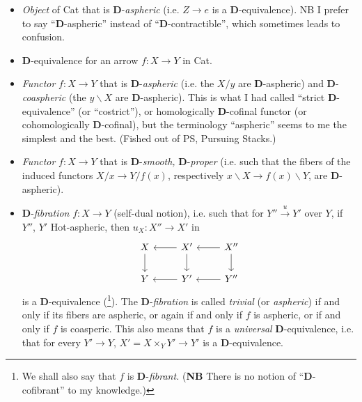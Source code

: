 \documentclass[11pt]{article}
\newcommand{\msp}[1]{\marginpar{\footnotesize [#1]}}
\newcommand{\D}{\mathbf{D}}
\begin{document}
\begin{itemize}
\item[(i)] \textit{Object} of Cat that is $\D$-\textit{aspheric} (i.e. $Z \longrightarrow e$ is a $\D$-equivalence). NB I prefer to say ``$\D$-aspheric'' instead of ``$\D$-contractible'', which sometimes leads to confusion.

\item[\textcircled{ii}] $\D$-equivalence for an arrow $f : X \longrightarrow Y$ in Cat.

\item[(iii)] \textit{Functor} $f : X \longrightarrow Y$ that is $\D$-\textit{aspheric} (i.e. the $X/y$ are $\D$-aspheric) and $\D$-\textit{coaspheric} (the $y\backslash X$ are $\D$-aspheric). This is what I had called ``strict $\D$-equivalence'' (or ``costrict''), or homologically $\D$-cofinal functor (or cohomologically $\D$-cofinal), but the terminology ``aspheric'' seems to me the simplest and the best. (Fished out of PS, Pursuing Stacks.)

\item[(iv)] \textit{Functor} $f : X \longrightarrow Y$ that is $\D$-\textit{smooth,} $\D$-\textit{proper} (i.e. such that the fibers of the induced functors $X/x \longrightarrow Y/f(x)$, respectively $x\backslash X \longrightarrow f(x)\backslash Y$, are $\D$-aspheric).

\item[(v)] $\D$-\textit{fibration} $f : X \longrightarrow Y$ (self-dual notion), i.e. such that for $Y'' \xrightarrow{u} Y'$ over $Y$, if $Y''$, $Y'$ Hot-aspheric, then $u_X : X'' \longrightarrow X'$ in
\[
\begin{tikzcd}
X \arrow[d] & X' \arrow[l] \arrow[d] & X'' \arrow[l] \arrow[d] \\
Y & Y' \arrow[l] & Y'' \arrow[l]
\end{tikzcd}
\]
is a $\D$-equivalence (\footnote{We shall also say that $f$ is $\D$-\textit{fibrant.} (\textbf{NB} There is no notion of ``$\D$-cofibrant'' to my knowledge.)}). The $\D$-\textit{fibration} is called \textit{trivial} (or \textit{aspheric}) if and only if its fibers are aspheric, or again if and only if $f$ is aspheric, or if and only if $f$ is coasperic. This also means that $f$ is a \textit{universal} $\D$-equivalence, %
\msp{page 2}
i.e. that for every $Y' \longrightarrow Y$, $X' = X \times_Y Y' \longrightarrow Y'$ is a $\D$-equivalence.


\end{itemize}
\end{document}
